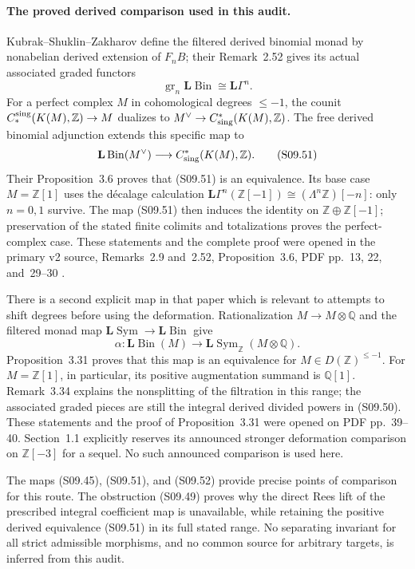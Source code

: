 \paragraph{The proved derived comparison used in this audit.}
Kubrak--Shuklin--Zakharov define the filtered derived
binomial monad by nonabelian derived extension of
$F_nB$; their Remark~2.52 gives its actual associated
graded functors
\[
 \operatorname{gr}_n\mathbf L\operatorname{Bin}
                  \cong\mathbf L\Gamma^n.
 \tag{S09.50}
\]
For a perfect complex $M$ in cohomological degrees
$\leq-1$, the counit
$C_*^{\rm sing}(K(M),\mathbb Z)\to M$ dualizes to
$M^\vee\to C^*_{\rm sing}(K(M),\mathbb Z)$.
The free derived binomial adjunction extends this
specific map to
\[
 \mathbf L\operatorname{Bin}(M^\vee)
        \longrightarrow C^*_{\rm sing}(K(M),\mathbb Z).
 \tag{S09.51}
\]
Their Proposition~3.6 proves that (S09.51) is an
equivalence.  Its base case $M=\mathbb Z[1]$ uses
the d\'ecalage calculation
$\mathbf L\Gamma^n(\mathbb Z[-1])
\cong(\Lambda^n\mathbb Z)[-n]$: only $n=0,1$
survive.  The map (S09.51) then induces the identity
on $\mathbb Z\oplus\mathbb Z[-1]$; preservation of
the stated finite colimits and totalizations proves
the perfect-complex case.  These statements and
the complete proof were opened in the primary v2
source, Remarks~2.9 and~2.52, Proposition~3.6,
PDF pp.~13, 22, and~29--30
\cite{KubrakShuklinZakharov2026_check}.

There is a second explicit map in that paper which
is relevant to attempts to shift degrees before
using the deformation.  Rationalization
$M\to M\otimes\mathbb Q$ and the filtered monad map
$\mathbf L\operatorname{Sym}\to\mathbf L\operatorname{Bin}$
give
\[
 \alpha:\mathbf L\operatorname{Bin}(M)
       \longrightarrow
          \mathbf L\operatorname{Sym}_{\mathbb Z}
                              (M\otimes\mathbb Q).
 \tag{S09.52}
\]
Proposition~3.31 proves that this map is an
equivalence for $M\in D(\mathbb Z)^{\leq-1}$.
For $M=\mathbb Z[1]$, in particular, its positive
augmentation summand is $\mathbb Q[1]$.
Remark~3.34 explains the nonsplitting of the
filtration in this range; the associated graded
pieces are still the integral derived divided
powers in (S09.50).  These statements and the
proof of Proposition~3.31 were opened on PDF
pp.~39--40.  Section~1.1 explicitly reserves its
announced stronger deformation comparison on
$\mathbb Z[-3]$ for a sequel.  No such announced
comparison is used here.

The maps (S09.45), (S09.51), and (S09.52) provide
precise points of comparison for this route.
The obstruction (S09.49) proves why the direct
Rees lift of the prescribed integral coefficient
map is unavailable, while retaining the positive
derived equivalence (S09.51) in its full stated
range.  No separating invariant for all strict
admissible morphisms, and no common source for
arbitrary targets, is inferred from this audit.
